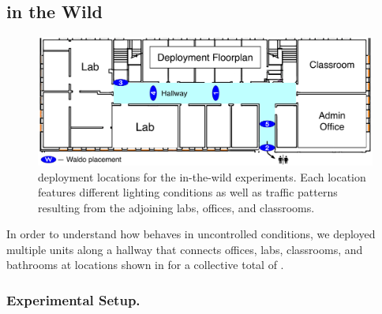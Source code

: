 \subsection{\sysnames in the Wild}


\begin{figure}[t]
\centering
\includegraphics[width=1.0\columnwidth]{figs/floorplan.pdf}
\caption{\sysname deployment locations for the in-the-wild experiments. Each location features different lighting conditions as well as traffic patterns resulting from the adjoining labs, offices, and classrooms. \label{fig:floorplan}}
\end{figure}


In order to understand how \sysname behaves in uncontrolled conditions, we deployed multiple \sysname units along a hallway that connects offices, labs, classrooms, and bathrooms at locations shown in  for a collective total of \ITWdays.  


\subsubsection{Experimental Setup.}

